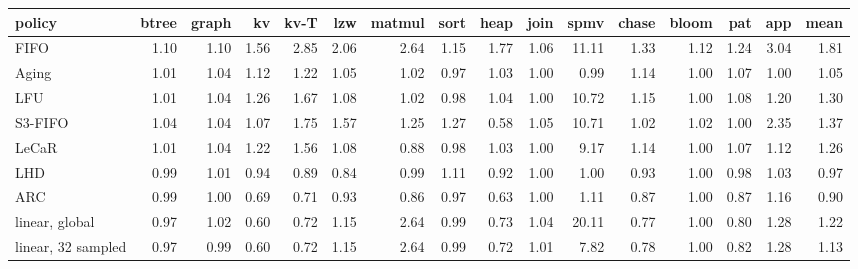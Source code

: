 \begin{tabular}{lrrrrrrrrrrrrrrr}
\toprule
policy & btree & graph & kv & kv-T & lzw & matmul & sort & heap & join & spmv & chase & bloom & pat & app & mean \\
\midrule
FIFO & 1.10 & 1.10 & 1.56 & 2.85 & 2.06 & 2.64 & 1.15 & 1.77 & 1.06 & 11.11 & 1.33 & 1.12 & 1.24 & 3.04 & 1.81 \\
Aging & 1.01 & 1.04 & 1.12 & 1.22 & 1.05 & 1.02 & 0.97 & 1.03 & 1.00 & 0.99 & 1.14 & 1.00 & 1.07 & 1.00 & 1.05 \\
LFU & 1.01 & 1.04 & 1.26 & 1.67 & 1.08 & 1.02 & 0.98 & 1.04 & 1.00 & 10.72 & 1.15 & 1.00 & 1.08 & 1.20 & 1.30 \\
S3-FIFO & 1.04 & 1.04 & 1.07 & 1.75 & 1.57 & 1.25 & 1.27 & 0.58 & 1.05 & 10.71 & 1.02 & 1.02 & 1.00 & 2.35 & 1.37 \\
LeCaR & 1.01 & 1.04 & 1.22 & 1.56 & 1.08 & 0.88 & 0.98 & 1.03 & 1.00 & 9.17 & 1.14 & 1.00 & 1.07 & 1.12 & 1.26 \\
LHD & 0.99 & 1.01 & 0.94 & 0.89 & 0.84 & 0.99 & 1.11 & 0.92 & 1.00 & 1.00 & 0.93 & 1.00 & 0.98 & 1.03 & 0.97 \\
ARC & 0.99 & 1.00 & 0.69 & 0.71 & 0.93 & 0.86 & 0.97 & 0.63 & 1.00 & 1.11 & 0.87 & 1.00 & 0.87 & 1.16 & 0.90 \\
linear, global & 0.97 & 1.02 & 0.60 & 0.72 & 1.15 & 2.64 & 0.99 & 0.73 & 1.04 & 20.11 & 0.77 & 1.00 & 0.80 & 1.28 & 1.22 \\
linear, 32 sampled & 0.97 & 0.99 & 0.60 & 0.72 & 1.15 & 2.64 & 0.99 & 0.72 & 1.01 & 7.82 & 0.78 & 1.00 & 0.82 & 1.28 & 1.13 \\
\bottomrule
\end{tabular}
